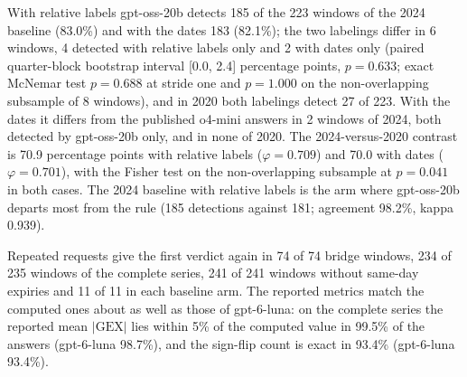 With relative labels gpt-oss-20b detects 185 of the 223 windows of the 2024 baseline (83.0\%) and with the dates 183 (82.1\%); the two labelings differ in 6 windows, 4 detected with relative labels only and 2 with dates only (paired quarter-block bootstrap interval [0.0, 2.4] percentage points, $p=0.633$; exact McNemar test $p=0.688$ at stride one and $p=1.000$ on the non-overlapping subsample of 8 windows), and in 2020 both labelings detect 27 of 223. With the dates it differs from the published o4-mini answers in 2 windows of 2024, both detected by gpt-oss-20b only, and in none of 2020. The 2024-versus-2020 contrast is 70.9 percentage points with relative labels ($\varphi=0.709$) and 70.0 with dates ($\varphi=0.701$), with the Fisher test on the non-overlapping subsample at $p=0.041$ in both cases. The 2024 baseline with relative labels is the arm where gpt-oss-20b departs most from the rule (185 detections against 181; agreement 98.2\%, kappa 0.939).

Repeated requests give the first verdict again in 74 of 74 bridge windows, 234 of 235 windows of the complete series, 241 of 241 windows without same-day expiries and 11 of 11 in each baseline arm. The reported metrics match the computed ones about as well as those of gpt-6-luna: on the complete series the reported mean $|\mathrm{GEX}|$ lies within 5\% of the computed value in 99.5\% of the answers (gpt-6-luna 98.7\%), and the sign-flip count is exact in 93.4\% (gpt-6-luna 93.4\%).

